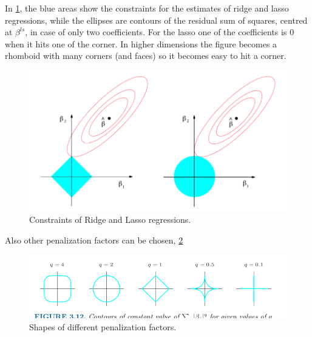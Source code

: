 \documentclass[12pt, letterpaper]{article}
\theoremstyle{definition}
\begin{document}
In \ref{ridge_lasso}, the blue areas show the constraints for the estimates of ridge and lasso regressions, while the ellipses are contours of the residual sum of squares, centred at $\beta^{ls}$, in case of only two coefficients. For the lasso one of the coefficients is $0$ when it hits one of the corner. In higher dimensions the figure becomes a rhomboid with many corners (and faces) so it becomes easy to hit a corner. 
\begin{figure}
\centering
\includegraphics[scale=0.4]{img/ridge_lasso}
\caption{Constraints of Ridge and Lasso regressions.}
\label{ridge_lasso}
\end{figure}

Also other penalization factors can be chosen, \ref{penalization}

\begin{figure}
\centering
\includegraphics[scale=0.4]{img/penalization}
\caption{Shapes of different penalization factors.}
\label{penalization}
\end{figure}
\end{document}
